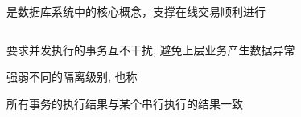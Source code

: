 
\begin{frame}{}
  \begin{center}
    是数据库系统中的核心概念，支撑在线交易顺利进行
  \end{center}

  \begin{columns}
  \end{columns}

  \vspace{0.30cm}
  \begin{center}
    要求并发执行的事务互不干扰, 避免上层业务产生数据异常
  \end{center}
\end{frame}

\begin{frame}{}
  \begin{center}
    强弱不同的隔离级别, 也称

    \vspace{0.30cm}
  \end{center}
\end{frame}




\begin{frame}{}
  \begin{center}
    所有事务的执行结果与某个串行执行的结果一致

    \vspace{0.50cm}
		\resizebox{0.50\textwidth}{!}{}
  \end{center}
\end{frame}

